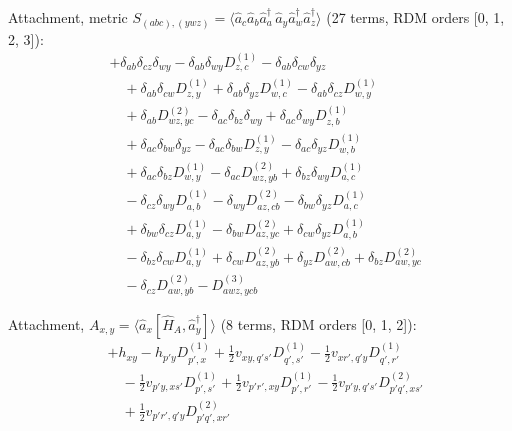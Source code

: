\noindent Attachment, metric $S_{(abc),(ywz)}=\langle \hat a_c\hat a_b\hat a_a^\dagger\,\hat a_y\hat a_w^\dagger \hat a_z^\dagger\rangle$ (27 terms, RDM orders [0, 1, 2, 3]):
\begin{align*}
&+\delta_{ab}\delta_{cz}\delta_{wy}-\delta_{ab}\delta_{wy}D^{(1)}_{z,c}-\delta_{ab}\delta_{cw}\delta_{yz} \\
&\quad +\delta_{ab}\delta_{cw}D^{(1)}_{z,y}+\delta_{ab}\delta_{yz}D^{(1)}_{w,c}-\delta_{ab}\delta_{cz}D^{(1)}_{w,y} \\
&\quad +\delta_{ab}D^{(2)}_{wz,yc}-\delta_{ac}\delta_{bz}\delta_{wy}+\delta_{ac}\delta_{wy}D^{(1)}_{z,b} \\
&\quad +\delta_{ac}\delta_{bw}\delta_{yz}-\delta_{ac}\delta_{bw}D^{(1)}_{z,y}-\delta_{ac}\delta_{yz}D^{(1)}_{w,b} \\
&\quad +\delta_{ac}\delta_{bz}D^{(1)}_{w,y}-\delta_{ac}D^{(2)}_{wz,yb}+\delta_{bz}\delta_{wy}D^{(1)}_{a,c} \\
&\quad -\delta_{cz}\delta_{wy}D^{(1)}_{a,b}-\delta_{wy}D^{(2)}_{az,cb}-\delta_{bw}\delta_{yz}D^{(1)}_{a,c} \\
&\quad +\delta_{bw}\delta_{cz}D^{(1)}_{a,y}-\delta_{bw}D^{(2)}_{az,yc}+\delta_{cw}\delta_{yz}D^{(1)}_{a,b} \\
&\quad -\delta_{bz}\delta_{cw}D^{(1)}_{a,y}+\delta_{cw}D^{(2)}_{az,yb}+\delta_{yz}D^{(2)}_{aw,cb}+\delta_{bz}D^{(2)}_{aw,yc} \\
&\quad -\delta_{cz}D^{(2)}_{aw,yb}-D^{(3)}_{awz,ycb}
\end{align*}

\noindent Attachment, $A_{x,y}=\langle \hat a_x[\hat H_A,\hat a_y^\dagger]\rangle$ (8 terms, RDM orders [0, 1, 2]):
\begin{align*}
&+h_{xy}-h_{p'y}D^{(1)}_{p',x}+\tfrac12v_{xy,q's'}D^{(1)}_{q',s'}-\tfrac12v_{xr',q'y}D^{(1)}_{q',r'} \\
&\quad -\tfrac12v_{p'y,xs'}D^{(1)}_{p',s'}+\tfrac12v_{p'r',xy}D^{(1)}_{p',r'}-\tfrac12v_{p'y,q's'}D^{(2)}_{p'q',xs'} \\
&\quad +\tfrac12v_{p'r',q'y}D^{(2)}_{p'q',xr'}
\end{align*}

